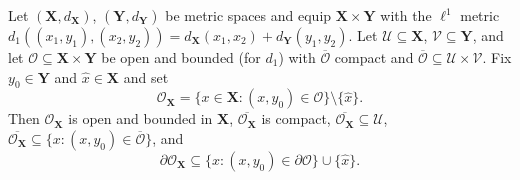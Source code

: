\begin{lemma}
Let $(\mathbf X,d_{\mathbf X})$, $(\mathbf Y,d_{\mathbf Y})$ be metric spaces and equip $\mathbf X\times\mathbf Y$ with the $\ell^1$ metric $d_1((x_1,y_1),(x_2,y_2))=d_{\mathbf X}(x_1,x_2)+d_{\mathbf Y}(y_1,y_2)$. Let $\mathcal U\subseteq\mathbf X$, $\mathcal V\subseteq\mathbf Y$, and let $\mathcal O\subseteq\mathbf X\times\mathbf Y$ be open and bounded (for $d_1$) with $\overline{\mathcal O}$ compact and $\overline{\mathcal O}\subseteq\mathcal U\times\mathcal V$. Fix $y_0\in\mathbf Y$ and $\hat x\in\mathbf X$ and set
\[
\mathcal O_{\mathbf X}=\{x\in\mathbf X:(x,y_0)\in\mathcal O\}\setminus\{\hat x\}.
\]
Then $\mathcal O_{\mathbf X}$ is open and bounded in $\mathbf X$, $\overline{\mathcal O_{\mathbf X}}$ is compact, $\overline{\mathcal O_{\mathbf X}}\subseteq\mathcal U$, $\overline{\mathcal O_{\mathbf X}}\subseteq\{x:(x,y_0)\in\overline{\mathcal O}\}$, and
\[
\partial\mathcal O_{\mathbf X}\subseteq\{x:(x,y_0)\in\partial\mathcal O\}\cup\{\hat x\}.
\]
\end{lemma}
